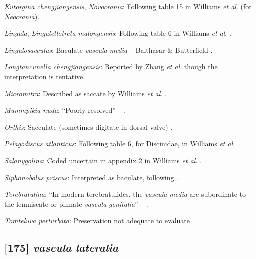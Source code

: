 \documentclass[openany]{book}
\theoremstyle{definition}
\theoremstyle{definition}
\theoremstyle{definition}
\theoremstyle{remark}
\begin{document}
\hypertarget{Kutorgina_chengjiangensis-coding-174}{}
\emph{Kutorgina chengjiangensis}, \emph{Novocrania}: Following table 15
in Williams \emph{et al}.
\citeyearpar{Williams2000LinguliformeaCraniiformea} (for
\emph{Neocrania}).

\hypertarget{Lingula-coding-174}{}
\emph{Lingula}, \emph{Lingulellotreta malongensis}: Following table 6 in
Williams \emph{et al}.
\citeyearpar{Williams2000LinguliformeaCraniiformea}.

\hypertarget{Lingulosacculus-coding-174}{}
\emph{Lingulosacculus}: Baculate \emph{vascula} \emph{media} --
Balthasar \& Butterfield \citeyearpar{Balthasar2009EarlyCambrian}.

\hypertarget{Longtancunella_chengjiangensis-coding-174}{}
\emph{Longtancunella chengjiangensis}: Reported by Zhang \emph{et al}.
\citeyearpar[2011T]{Zhang2007Agregarious} though the interpretation is
tentative.

\hypertarget{Micromitra-coding-174}{}
\emph{Micromitra}: Described as saccate by Williams \emph{et al}.
\citeyearpar{Williams1998Thediversity}.

\hypertarget{Mummpikia_nuda-coding-174}{}
\emph{Mummpikia nuda}: ``Poorly resolved'' --
\citet{Balthasar2008iMummpikia}.

\hypertarget{Orthis-coding-174}{}
\emph{Orthis}: Sacculate (sometimes digitate in dorsal valve)
\citep[p716]{Williams2000LinguliformeaCraniiformea}.

\hypertarget{Pelagodiscus_atlanticus-coding-174}{}
\emph{Pelagodiscus atlanticus}: Following table 6, for Discinidae, in
Williams \emph{et al}.
\citeyearpar{Williams2000LinguliformeaCraniiformea}.

\hypertarget{Salanygolina-coding-174}{}
\emph{Salanygolina}: Coded uncertain in appendix 2 in Williams \emph{et
al}. \citeyearpar{Williams1998Thediversity}.

\hypertarget{Siphonobolus_priscus-coding-174}{}
\emph{Siphonobolus priscus}: Interpreted as baculate, following
\citet{Havlicek1982LingulaceaPaterinacea}.

\hypertarget{Terebratulina-coding-174}{}
\emph{Terebratulina}: ``In modern terebratulides, the \emph{vascula}
\emph{media} are subordinate to the lemniscate or pinnate \emph{vascula}
\emph{genitalia}'' -- \citet{Williams1997Introduction}.

\hypertarget{Tomteluva_perturbata-coding-174}{}
\emph{Tomteluva perturbata}: Preservation not adequate to evaluate
\citep{Streng2016Anew}.

\subsection*{\texorpdfstring{{[}175{]} \emph{vascula}
\emph{lateralia}}{{[}175{]} vascula lateralia}}\label{vascula-lateralia}
\end{document}
